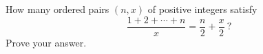 How many ordered pairs $(n,x)$ of positive integers satisfy
\[
\dfrac{1+2+\cdots+n}{x}=\dfrac {n}{2}+\dfrac {x}{2}\ ?
\]
Prove your answer.
